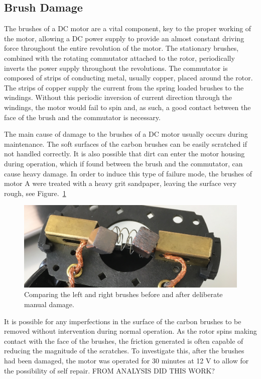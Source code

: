 \subsection{Brush Damage}
The brushes of a DC motor are a vital component, key to the proper working of the motor, allowing a DC power supply to provide an almost constant driving force throughout the entire revolution of the motor. The stationary brushes, combined with the rotating commutator attached to the rotor, periodically inverts the power supply throughout the revolutions. The commutator is composed of strips of conducting metal, usually copper, placed around the rotor. The strips of copper supply the current from the spring loaded brushes to the windings.  Without this periodic inversion of current direction through the windings, the motor would fail to spin and, as such, a good contact between the face of the brush and the commutator is necessary. 

The main cause of damage to the brushes of a DC motor usually occurs during maintenance. The soft surfaces of the carbon brushes can be easily scratched if not handled correctly. It is also possible that dirt can enter the motor housing during operation, which if found between the brush and the commutator, can cause heavy damage. In order to induce this type of failure mode, the brushes of motor A were treated with a heavy grit sandpaper, leaving the surface very rough, see Figure.~\ref{fig:brush_damage}

\begin{figure}[t]
    \includegraphics[width=1.0\textwidth]{fig/brush_comparison.jpg}
    \caption[Brush Damage]{Comparing the left and right brushes before and after deliberate manual damage.}
    \label{fig:brush_damage}
\end{figure}

It is possible for any imperfections in the surface of the carbon brushes to be removed without intervention during normal operation. As the rotor spins making contact with the face of the brushes, the friction generated is often capable of reducing the magnitude of the scratches. To investigate this, after the brushes had been damaged, the motor was operated for 30 minutes at 12 V to allow for the possibility of self repair. FROM ANALYSIS DID THIS WORK?

